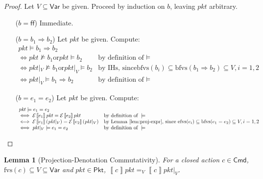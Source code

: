 \documentclass{article}
\newcommand{\pkt}{\mathit{pkt}}
\newcommand{\denote}[1]{\left\llbracket#1\right\rrbracket}
\newcommand{\edenote}[1]{\mathcal{E}\denote{#1}}
\newcommand{\FALSE}{\mathsf{ff}}
\newcommand{\Cmd}{\mathsf{Cmd}}
\newcommand{\Pkt}{\mathsf{Pkt}}
\newcommand{\Var}{\mathsf{Var}}
\newcommand{\fvs}{\textrm{fvs}}
\newcommand{\efvs}{\textrm{efvs}}
\newcommand{\bfvs}{\textrm{bfvs}}
\theoremstyle{plain}
\newtheorem{lemma}{Lemma}
\theoremstyle{definition}
\theoremstyle{remark}
\begin{document}
\begin{proof}
  Let $V \subseteq \Var$ be given.
  Proceed by induction on $b$, leaving $\pkt$ arbitrary.
  \begin{enumerate}[align=left]
  \item[($b = \FALSE$)] Immediate.
  \item[($b = b_1 \Rightarrow b_2$)]
    Let $\pkt$ be given. Compute:
    \[\begin{array}{ll}
    \pkt \models b_1 \Rightarrow b_2 \\
    \iff \pkt \not\models b_1 \text{or} \pkt\models b_2 & \text{by definition of } \models   \\
    \iff \pkt|_V \not\models b_1 \text{or} \pkt|_V \models b_2  & \text{by IHs, since} \bfvs(b_i) \subseteq \bfvs(b_1 \Rightarrow b_2) \subseteq V, i = 1,2  \\
    \iff \pkt|_V \models b_1 \Rightarrow b_2
    & \text{by definition of } \models
    \end{array}\]

  \item[($b = e_1 = e_2$)] Let $\pkt$ be given. Compute:
    \[\begin{array}{ll}
    \pkt \models e_1 = e_2 \\
    \iff \edenote{e_1}\pkt = \edenote{e_2}\pkt
    & \text{by definition of }\models \\
    \iff \edenote{e_1}(\pkt|_V) = \edenote{e_2}(\pkt|_V)
    & \text{by Lemma~\ref{lem:proj-expr}, since } \efvs(e_i) \subseteq \bfvs(e_1 = e_2) \subseteq V, i = 1,2 \\
    \iff \pkt|_V \models e_1 = e_2
    & \text{by definition of }\models
    \end{array}\]

  \end{enumerate}

\end{proof}


\begin{lemma}[Projection-Denotation Commutativity]
  \label{lem:proj-den-comm}
  For a closed action $c \in \Cmd$, $\fvs(c) \subseteq V \subseteq \Var$ and
  $\pkt \in \Pkt$, $\denote{c} \pkt =_V \denote{c} \pkt|_V$.
\end{lemma}
\end{document}

